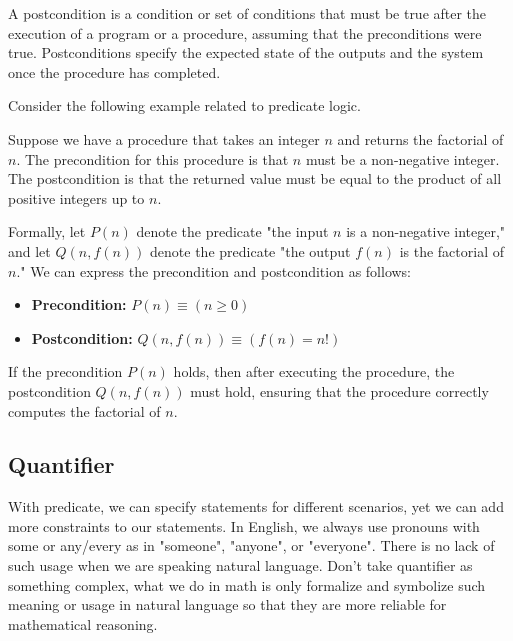 \begin{definition}[Postcondition]
    A postcondition is a condition or set of conditions that must be true after the execution of a program or a procedure, assuming that the preconditions were true. Postconditions specify the expected state of the outputs and the system once the procedure has completed.
\end{definition}
Consider the following example related to predicate logic. 

\begin{example}
    Suppose we have a procedure that takes an integer \( n \) and returns the factorial of \( n \). The precondition for this procedure is that \( n \) must be a non-negative integer. The postcondition is that the returned value must be equal to the product of all positive integers up to \( n \).

Formally, let \( P(n) \) denote the predicate "the input \( n \) is a non-negative integer," and let \( Q(n, f(n)) \) denote the predicate "the output \( f(n) \) is the factorial of \( n \)." We can express the precondition and postcondition as follows:

\begin{itemize}
    \item \textbf{Precondition:} \( P(n) \equiv (n \geq 0) \)
    \item \textbf{Postcondition:} \( Q(n, f(n)) \equiv (f(n) = n!) \)
\end{itemize}

If the precondition \( P(n) \) holds, then after executing the procedure, the postcondition \( Q(n, f(n)) \) must hold, ensuring that the procedure correctly computes the factorial of \( n \).
\end{example}

\subsection{Quantifier}
With predicate, we can specify statements for different scenarios, yet we can add more constraints to our statements. In English, we always use pronouns with some or any/every as in "someone", "anyone", or "everyone". There is no lack of such usage when we are speaking natural language. Don't take quantifier as something complex, what we do in math is only formalize and symbolize such meaning or usage in natural language so that they are more reliable for mathematical reasoning.

